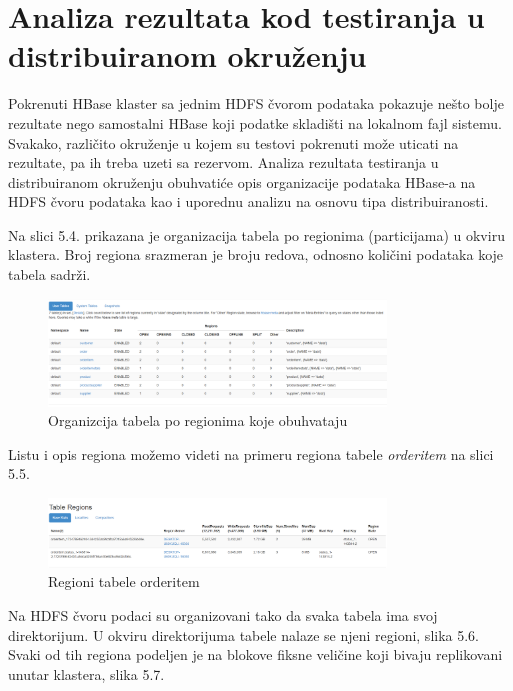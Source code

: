 \documentclass[12pt,oneside]{memoir}
\begin{document}
\section{Analiza rezultata kod testiranja u distribuiranom okruženju}

Pokrenuti HBase klaster sa jednim HDFS čvorom podataka pokazuje nešto bolje rezultate nego samostalni HBase koji podatke skladišti na lokalnom fajl sistemu. Svakako, različito okruženje u kojem su testovi pokrenuti može uticati na rezultate, pa ih treba uzeti sa rezervom.  Analiza rezultata testiranja u distribuiranom okruženju obuhvatiće opis organizacije podataka HBase-a na HDFS čvoru podataka kao i uporednu analizu na osnovu tipa distribuiranosti. 

Na slici 5.4. prikazana je organizacija tabela po regionima (particijama) u okviru klastera. Broj regiona srazmeran je broju redova, odnosno količini podataka koje tabela sadrži. 

\begin{figure}[!ht]
  \centering
  \includegraphics[width=0.8\textwidth]{master-dist.png}
  \caption{Organizcija tabela po regionima koje obuhvataju}
  \label{fig:grafikon}
\end{figure}

\pagebreak
Listu i opis regiona možemo videti na primeru regiona tabele \textit{orderitem} na slici 5.5.

\begin{figure}[!ht]
  \centering
  \includegraphics[width=0.8\textwidth]{orderitem-regions.png}
  \caption{Regioni tabele orderitem}
  \label{fig:grafikon}
\end{figure}

Na HDFS čvoru podaci su organizovani tako da svaka tabela ima svoj direktorijum. U okviru direktorijuma tabele nalaze se njeni regioni, slika 5.6. Svaki od tih regiona podeljen je na blokove fiksne veličine koji bivaju replikovani unutar klastera, slika 5.7.
\end{document}
